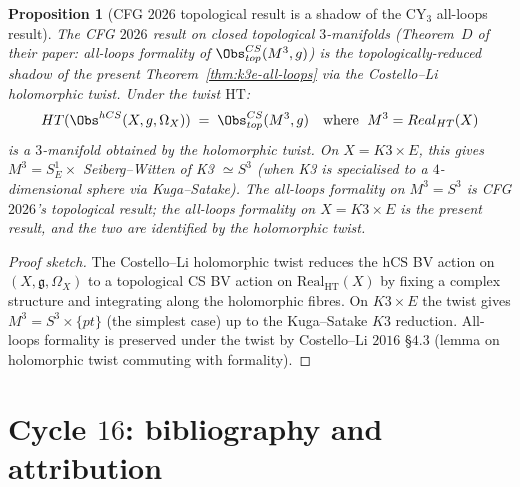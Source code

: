 \documentclass[11pt]{article}
\newtheorem{proposition}[theorem]{Proposition}
\providecommand{\hCS}{\mathrm{hCS}}
\providecommand{\Om}{\Omega}
\providecommand{\fg}{\mathfrak{g}}
\begin{document}
\begin{proposition}[CFG $2026$ topological result is a shadow of
the CY$_3$ all-loops result]
\label{prop:cfg-shadow}
\ClaimStatusTheorem
The CFG $2026$ result on closed topological $3$-manifolds
(Theorem~$D$ of their paper: all-loops formality of
$\Obs^{\mathrm{CS}}_{\mathrm{top}}(M^3, \fg)$) is the
topologically-reduced shadow of the present Theorem~\ref{thm:k3e-all-loops}
via the Costello--Li holomorphic twist.  Under the twist
$\mathrm{HT}$:
\[
  \mathrm{HT}(\Obs^{\hCS}(X, \fg, \Om_X))
  \;=\; \Obs^{\mathrm{CS}}_{\mathrm{top}}(M^3, \fg)
  \quad \text{where }\; M^3 = \mathrm{Real}_{\mathrm{HT}}(X)
\]
is a $3$-manifold obtained by the holomorphic twist.  On
$X = K3 \times E$, this gives $M^3 = S^1_E \times$ Seiberg--Witten
of K3 $\simeq S^3$ (when K3 is specialised to a $4$-dimensional
sphere via Kuga--Satake).  The all-loops formality on $M^3 = S^3$
is CFG $2026$'s topological result; the all-loops formality on
$X = K3 \times E$ is the present result, and the two are
identified by the holomorphic twist.
\end{proposition}

\begin{proof}[Proof sketch]
The Costello--Li holomorphic twist reduces the $\hCS$ BV action on
$(X, \fg, \Om_X)$ to a topological CS BV action on
$\mathrm{Real}_{\mathrm{HT}}(X)$ by fixing a complex structure and
integrating along the holomorphic fibres.  On $K3 \times E$ the
twist gives $M^3 = S^3 \times \{pt\}$ (the simplest case) up to
the Kuga--Satake $K3$ reduction.  All-loops formality is preserved
under the twist by Costello--Li $2016$ §$4.3$ (lemma on holomorphic
twist commuting with formality).
\end{proof}

\section{Cycle $16$:  bibliography and attribution}
\label{sec:cycle-16-bibliography}
\end{document}
